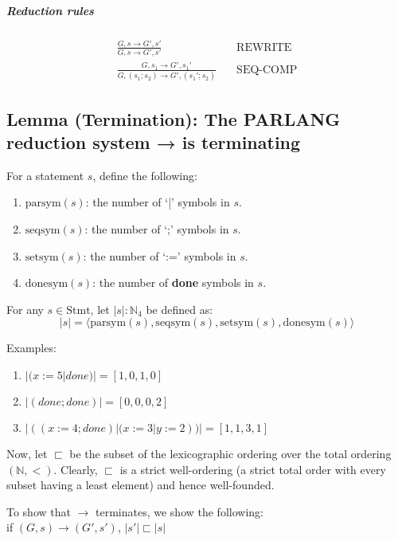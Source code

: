 \subparagraph{Reduction rules} 
\begin{align*}
  \frac{G, s \rightarrow G', s'}{G, s \rightarrow  G', s'} & \quad \text{REWRITE} \\
  \frac{G, s_1 \rightarrow  G', s_1'}{G, (s_1; s_2) \rightarrow  G', (s_1'; s_2)} & \quad \text{SEQ-COMP}
\end{align*}

\subsection{Lemma (Termination): The PARLANG reduction system → is terminating}
For a statement $s$, define the following:
\begin{enumerate}
  \item $\text{parsym}(s)$: the number of `|' symbols in $s$.
  \item $\text{seqsym}(s)$: the number of `;' symbols in $s$.
  \item $\text{setsym}(s)$: the number of `:=' symbols in $s$.
  \item $\text{donesym}(s)$: the number of \textbf{done} symbols in $s$.
\end{enumerate}

For any $s \in \text{Stmt}$, let $|s| : \mathbb{N}_4$ be defined as: \\ 
\[
|s| = \langle \text{parsym}(s), \text{seqsym}(s), \text{setsym}(s), \text{donesym}(s) \rangle
\]

Examples:
\begin{enumerate}
\item $|(x:=5|done)| = [1, 0, 1, 0]$
\item $|(done;done)| = [0, 0, 0, 2]$
\item $|((x:=4;done)|(x:=3|y:=2))| = [1, 1, 3, 1]$
\end{enumerate}

Now, let $\sqsubset$ be the subset of the lexicographic ordering over the total ordering $(\mathbb{N}, <)$. Clearly, $\sqsubset$ is a strict well-ordering (a strict total order with every subset having a least element) and hence well-founded.

To show that $\rightarrow$ terminates, we show the following: \\
if $(G,s) \rightarrow (G', s')$,  $|s'| \sqsubset |s|$